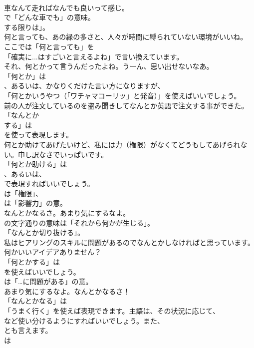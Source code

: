 \documentclass[8pt]{extreport}
\begin{document}
\begin{CJK}{UTF8}{min}
\\	車なんて走ればなんでも良いって感じ。 
\\	で「どんな車でも」の意味。
\\	する限りは」。	
\\	何と言っても、あの緑の多さと、人々が時間に縛られていない環境がいいね。 
\\	ここでは「何と言っても」を
\\	「確実に...はすごいと言えるよね」で言い換えています。	
\\	それ、何とかって言うんだったよね。うーん、思い出せないなあ。 
\\	「何とか」は
\\	、あるいは、かなりくだけた言い方になりますが、
\\	「何とかいうやつ（「ワチャマコーリッ」と発音）」を使えばいいでしょう。	
\\	前の人が注文しているのを盗み聞きしてなんとか英語で注文する事ができた。 
\\	「なんとか 
\\	する」は
\\	を使って表現します。	
\\	何とか助けてあげたいけど、私には力（権限）がなくてどうもしてあげられない。申し訳なさでいっぱいです。 
\\	「何とか助ける」は 
\\	、あるいは、
\\	で表現すればいいでしょう。
\\	は「権限」、
\\	は「影響力」の意。	
\\	なんとかなるさ。あまり気にするなよ。 
\\	の文字通りの意味は「それから何かが生じる」。
\\	「なんとか切り抜ける」。	
\\	私はヒアリングのスキルに問題があるのでなんとかしなければと思っています。何かいいアイデアありません？ 
\\	「何とかする」は 
\\	を使えばいいでしょう。
\\	は「…に問題がある」の意。	
\\	あまり気にするなよ。なんとかなるさ！ 
\\	「なんとかなる」は
\\	「うまく行く」を使えば表現できます。主語は、その状況に応じて、
\\	など使い分けるようにすればいいでしょう。また、
\\	とも言えます。
\\	は

\end{CJK}
\end{document}
